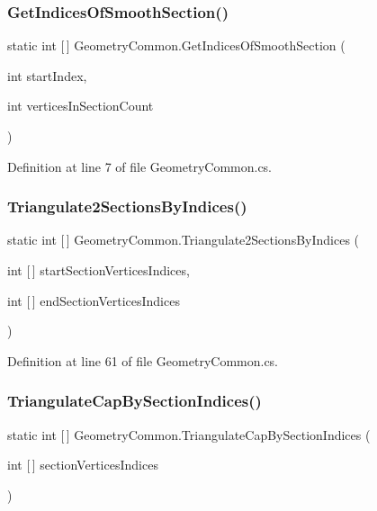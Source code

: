 \subsubsection{\texorpdfstring{GetIndicesOfSmoothSection()}{GetIndicesOfSmoothSection()}}
{\footnotesize\ttfamily static int \mbox{[}$\,$\mbox{]} Geometry\+Common.\+Get\+Indices\+Of\+Smooth\+Section (\begin{DoxyParamCaption}\item[{int}]{start\+Index,  }\item[{int}]{vertices\+In\+Section\+Count }\end{DoxyParamCaption})\hspace{0.3cm}{\ttfamily [static]}}



Definition at line 7 of file Geometry\+Common.\+cs.

\mbox{\label{class_geometry_common_aa6a96089933023f69fffeb799c87debb}} 
\subsubsection{\texorpdfstring{Triangulate2SectionsByIndices()}{Triangulate2SectionsByIndices()}}
{\footnotesize\ttfamily static int \mbox{[}$\,$\mbox{]} Geometry\+Common.\+Triangulate2\+Sections\+By\+Indices (\begin{DoxyParamCaption}\item[{int \mbox{[}$\,$\mbox{]}}]{start\+Section\+Vertices\+Indices,  }\item[{int \mbox{[}$\,$\mbox{]}}]{end\+Section\+Vertices\+Indices }\end{DoxyParamCaption})\hspace{0.3cm}{\ttfamily [static]}}



Definition at line 61 of file Geometry\+Common.\+cs.

\mbox{\label{class_geometry_common_af7e0cdd1981d96161e9169449808b8a4}} 
\subsubsection{\texorpdfstring{TriangulateCapBySectionIndices()}{TriangulateCapBySectionIndices()}}
{\footnotesize\ttfamily static int \mbox{[}$\,$\mbox{]} Geometry\+Common.\+Triangulate\+Cap\+By\+Section\+Indices (\begin{DoxyParamCaption}\item[{int \mbox{[}$\,$\mbox{]}}]{section\+Vertices\+Indices }\end{DoxyParamCaption})\hspace{0.3cm}{\ttfamily [static]}}



